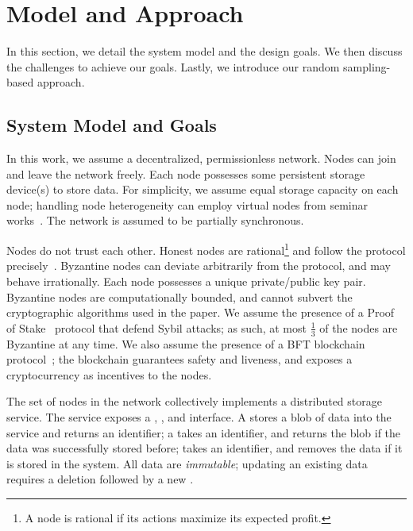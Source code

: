 \section{Model and Approach}
\label{sec:approach}

In this section, we detail the system model and the design goals.
We then discuss the challenges to achieve our goals.
Lastly, we introduce our random sampling-based approach.

\subsection{System Model and Goals}
\label{sec:approach:model}

In this work, we assume a decentralized, permissionless network.
Nodes can join and leave the network freely.
Each node possesses some persistent storage device(s) to store data.
For simplicity, we assume equal storage capacity on each node;
handling node heterogeneity can employ virtual nodes from seminar works~\cite{chord}.
The network is assumed to be partially synchronous.

Nodes do not trust each other.
Honest nodes are rational\footnote{A node is rational if its actions maximize its expected profit.} and follow the protocol precisely~\cite{bar}.
Byzantine nodes can deviate arbitrarily from the protocol, and may behave irrationally.
Each node possesses a unique private/public key pair.
Byzantine nodes are computationally bounded, and cannot subvert the cryptographic algorithms used in the paper.
We assume the presence of a Proof of Stake~\cite{algorand,ouroboros} protocol that defend Sybil attacks;
as such, at most $\frac{1}{3}$ of the nodes are Byzantine at any time.
We also assume the presence of a BFT blockchain protocol~\cite{algorand,bitcoin,ethereum,pbft,hotstuff};
the blockchain guarantees safety and liveness, and exposes a cryptocurrency as incentives to the nodes.

The set of nodes in the network collectively implements a distributed storage service.
The service exposes a , , and  interface.
A  stores a blob of data into the service and returns an identifier;
a  takes an identifier, and returns the blob if the data was successfully stored before;
 takes an identifier, and removes the data if it is stored in the system.
All data are \emph{immutable};
updating an existing data requires a deletion followed by a new .

